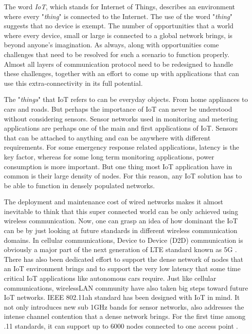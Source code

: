 \label{chapter:introduction}

The word \textit{IoT}, which stands for Internet of Things, describes an environment where every "\textit{thing}" is connected to the Internet. The use of the word "\textit{thing}" suggests that no device is exempt. The number of opportunities that a world where every device, small or large is connected to a global network brings, is beyond anyone's imagination. As always, along with opportunities come challenges that need to be resolved for such a scenario to function properly. Almost all layers of communication protocol need to be redesigned to handle these challenges, together with an effort to come up with applications that can use this extra-connectivity in its full potential.

The "\textit{things}" that IoT refers to can be everyday objects. From home appliances to cars and roads. But perhaps the importance of IoT can never be understood without considering sensors. Sensor networks used in monitoring and metering applications are perhaps one of the main and first applications of IoT. Sensors that can be attached to anything and can be anywhere with different requirements. For some emergency response related applications, latency is the key factor, whereas for some long term monitoring applications, power consumption is more important. But one thing most IoT application have in common is their large density of nodes. For this reason, any IoT solution has to be able to function in densely populated networks. 

The deployment and maintenance cost of wired networks makes it almost inevitable to think that this super connected world can be only achieved using wireless communication. Now, one can grasp an idea of how dominant the IoT can be by just looking at future standards in different wireless communication domains. In cellular communications, Device to Device (D2D) communication is obviously a major part of the next generation of LTE standard known as 5G \cite{doppler2009device}. There has also been dedicated effort to support the dense network of nodes that an IoT environment brings and to support the very low latency that some time critical IoT applications like autonomous cars require. Just like cellular communications, wirelessLAN community have also taken big steps toward future IoT networks. IEEE 802.11ah standard has been designed with IoT in mind. It not only introduces new sub 1GHz bands for sensor networks, also addresses the intense channel contention that a dense network brings. For the first time among .11 standards, it can support up to 6000 nodes connected to one access point \cite{khorov2015survey}. 

